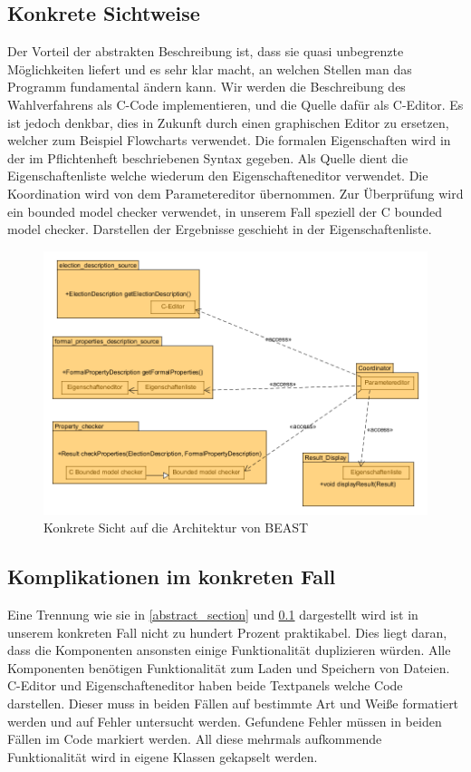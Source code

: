 \documentclass[a4paper]{scrreprt}
\begin{document}
\subsection{Konkrete Sichtweise} \label{concrete_section}
Der Vorteil der abstrakten Beschreibung ist, dass sie quasi unbegrenzte Möglichkeiten liefert und es sehr klar macht, an welchen Stellen man das Programm fundamental ändern kann. Wir werden die Beschreibung des Wahlverfahrens als C-Code implementieren, und die Quelle dafür als C-Editor. Es ist jedoch denkbar, dies in Zukunft durch einen graphischen Editor zu ersetzen, welcher zum Beispiel Flowcharts verwendet. Die formalen Eigenschaften wird in der im Pflichtenheft beschriebenen Syntax gegeben. Als Quelle dient die Eigenschaftenliste welche wiederum den Eigenschafteneditor verwendet. Die Koordination wird von dem Parametereditor übernommen. Zur Überprüfung wird ein bounded model checker verwendet, in unserem Fall speziell der C bounded model checker. Darstellen der Ergebnisse geschieht in der Eigenschaftenliste.  

\begin{figure}[H]
\includegraphics[scale=0.5]{highest-level-concrete-view.png}
\caption{Konkrete Sicht auf die Architektur von BEAST}
\label{concrete_view_of_beast_architecture}
\end{figure}

\subsection{Komplikationen im konkreten Fall}
Eine Trennung wie sie in \ref{abstract_section} und \ref{concrete_section} dargestellt wird ist in unserem konkreten Fall nicht zu hundert Prozent praktikabel. Dies liegt daran, dass die Komponenten ansonsten einige Funktionalität duplizieren würden. Alle Komponenten benötigen Funktionalität zum Laden und Speichern von Dateien. C-Editor und Eigenschafteneditor haben beide Textpanels welche Code darstellen. Dieser muss in beiden Fällen auf bestimmte Art und Weiße formatiert werden und auf Fehler untersucht werden. Gefundene Fehler müssen in beiden Fällen im Code markiert werden. All diese mehrmals aufkommende Funktionalität wird in eigene Klassen gekapselt werden.
\end{document}
